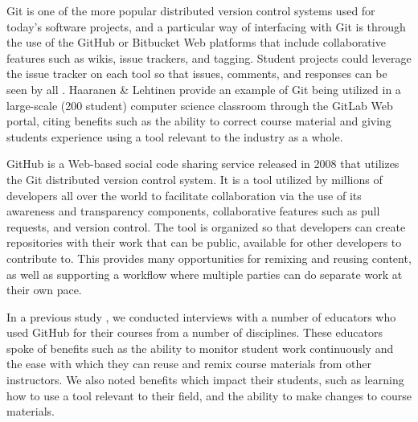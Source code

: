 Git is one of the more popular distributed version control systems used for today's software projects, and a particular way of interfacing with Git is through the use of the GitHub or Bitbucket Web platforms that include collaborative features such as wikis, issue trackers, and tagging. Student projects could leverage the issue tracker on each tool so that issues, comments, and responses can be seen by all \cite{kelleher2014employing}. Haaranen \& Lehtinen \cite{haaranen2015teaching} provide an example of Git being utilized in a large-scale (200 student) computer science classroom through the GitLab Web portal, citing benefits such as the ability to correct course material and giving students experience using a tool relevant to the industry as a whole.

GitHub is a Web-based social code sharing service released in 2008 that utilizes the Git distributed version control system. It is a tool utilized by millions of developers all over the world to facilitate collaboration via the use of its awareness and transparency components, collaborative features such as pull requests, and version control. The tool is organized so that developers can create repositories with their work that can be public, available for other developers to contribute to. This provides many opportunities for remixing and reusing content, as well as supporting a workflow where multiple parties can do separate work at their own pace.

In a previous study \cite{zagalsky}, we conducted interviews with a number of educators who used GitHub for their courses from a number of disciplines. These educators spoke of benefits such as the ability to monitor student work continuously and the ease with which they can reuse and remix course materials from other instructors. We also noted benefits which impact their students, such as learning how to use a tool relevant to their field, and the ability to make changes to course materials.
